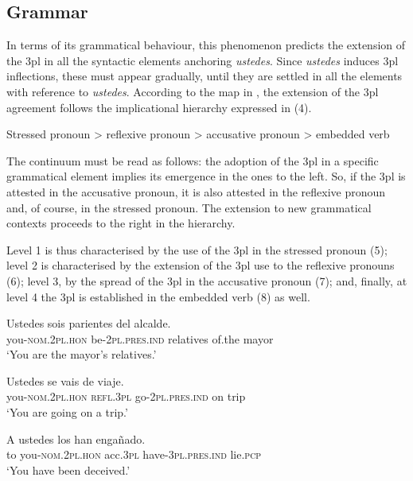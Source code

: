 \documentclass[output=paper]{LSP/langsci}
\begin{document}
\subsection{Grammar}
In terms of its grammatical behaviour, this phenomenon predicts the extension of the 3pl in all the syntactic elements anchoring \textit{ustedes}. Since \textit{ustedes} induces 3pl inflections, these must appear gradually, until they are settled in all the elements with reference to \textit{ustedes}. According to the map in , the extension of the 3pl agreement follows the implicational hierarchy expressed in (4).

\begin{exe}
\ex Stressed pronoun {\textgreater} reflexive pronoun {\textgreater} accusative pronoun {\textgreater} embedded verb
\end{exe}

The continuum must be read as follows: the adoption of the 3pl in a specific grammatical element implies its emergence in the ones to the left. So, if the 3pl is attested in the accusative pronoun, it is also attested in the reflexive pronoun and, of course, in the stressed pronoun. The extension to new grammatical contexts proceeds to the right in the hierarchy.

Level 1 is thus characterised by the use of the 3pl in the stressed pronoun (5); level 2 is characterised by the extension of the  3pl use to the reflexive pronouns (6); level 3, by the spread of the 3pl in the accusative pronoun (7); and, finally, at level 4 the 3pl is established in the embedded verb (8) as well.

\ea
\gll Ustedes                   sois                      parientes del     alcalde.\\
you-\textsc{nom.2pl.hon} be-\textsc{2pl.pres.ind} relatives of.the mayor\\
\glt   ‘You are the mayor’s relatives.’\\
\z

\ea
\gll Ustedes                    se            vais                      de viaje.\\
you-\textsc{nom.2pl.hon} \textsc{refl.3pl} go-\textsc{2pl.pres.ind} on trip\\
\glt   ‘You are going on a trip.’\\
\z

\ea
\gll A  ustedes                    los          han                          engañado.\\
to you-\textsc{nom.2pl.hon} acc.\textsc{3pl} have-\textsc{3pl.pres.ind} lie.\textsc{pcp}\\
\glt   ‘You have been deceived.’\\
\z
\end{document}
